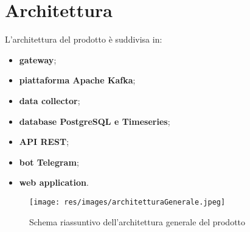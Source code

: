 \section{Architettura}

L'architettura del prodotto è suddivisa in:
	\begin{itemize}
	  	\item \textbf{gateway};
	  	\item \textbf{piattaforma Apache Kafka};
	  	\item \textbf{data collector};
	  	\item \textbf{database PostgreSQL e Timeseries};
	  	\item \textbf{API REST};
	  	\item \textbf{bot Telegram};
	  	\item \textbf{web application}.    
	\end{itemize} 

	\begin{figure}[H]
		\centering
		\texttt{[image: res/images/architetturaGenerale.jpeg]}
		\caption{Schema riassuntivo dell'architettura generale del prodotto}
	\end{figure}
	
